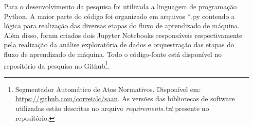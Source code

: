 Para o desenvolvimento da pesquisa foi utilizada a linguagem de programação Python. A maior parte do código foi organizado em arquivos *.py contendo a lógica para realização das diversas etapas do fluxo de aprendizado de máquina. Além disso, foram criados dois Jupyter Notebooks responsáveis respectivamente pela realização da análise exploratória de dados e  orquestração das etapas do fluxo de aprendizado de máquina. Todo o código-fonte está disponível no repositório da pesquisa no Github\footnote{Segmentador Automático de Atos Normativos. Disponível em: \url{https://github.com/correialc/saan}. As versões das bibliotecas de software utilizadas estão descritas no arquivo \textit{requirements.txt} presente no repositório.}.





